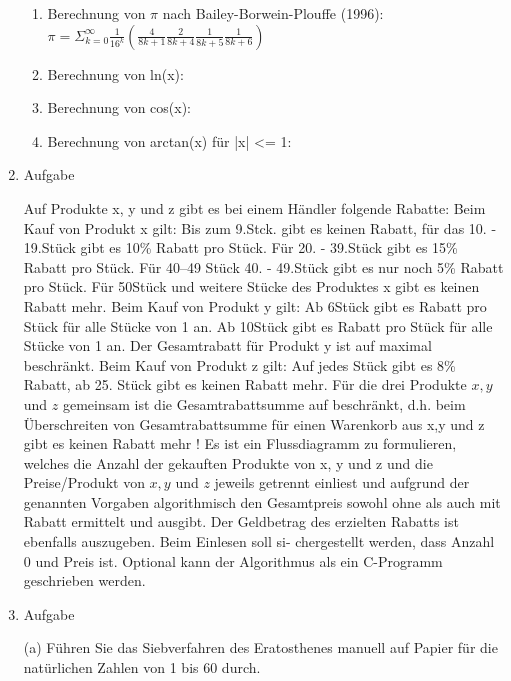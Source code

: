 \documentclass[12pt,a4paper]{scrreprt}
\begin{document}
\begin{enumerate}
\begin{enumerate}
\item Berechnung von $\pi$ nach Bailey-Borwein-Plouffe (1996): $ \pi = \Sigma_{k=0}^{\infty} \frac{1}{16^k} \left( \frac{4}{8k+1} \frac{2}{8k+4} \frac{1}{8k+5} \frac{1}{8k+6} \right)  $

\item Berechnung von ln(x):

\item Berechnung von cos(x):

\item Berechnung von arctan(x) für |x| <= 1:

\end{enumerate}

\item Aufgabe %

Auf Produkte x, y und z gibt es bei einem Händler folgende Rabatte:
Beim Kauf von Produkt x gilt:
Bis zum 9.Stck. gibt es keinen Rabatt, für das 10. - 19.Stück gibt es 10\% Rabatt pro Stück.
Für 20. - 39.Stück gibt es 15\% Rabatt pro Stück.
Für \numrange{40}{49} Stück 40. - 49.Stück gibt es nur noch 5\% Rabatt pro Stück.
Für \si{50}{Stück} und weitere Stücke des Produktes x gibt es keinen Rabatt mehr.
Beim Kauf von Produkt y gilt:
Ab \si{6}{Stück} gibt es  Rabatt pro Stück für alle Stücke von 1 an.
Ab \si{10}{Stück} gibt es  Rabatt pro Stück für alle Stücke von 1 an.
Der Gesamtrabatt für Produkt y ist auf maximal  beschränkt.
Beim Kauf von Produkt z gilt:
Auf jedes Stück gibt es 8\% Rabatt, ab 25. Stück gibt es keinen Rabatt mehr.
Für die drei Produkte $x, y$ und $z$ gemeinsam ist die Gesamtrabattsumme auf 
beschränkt, d.h. beim Überschreiten von  Gesamtrabattsumme für einen Warenkorb
aus x,y und z gibt es keinen Rabatt mehr !
Es ist ein Flussdiagramm zu formulieren, welches die Anzahl der gekauften Produkte von
x, y und z und die Preise/Produkt von $x, y$ und $z$ jeweils getrennt einliest und aufgrund der
genannten Vorgaben algorithmisch den Gesamtpreis sowohl ohne als auch mit Rabatt ermittelt
und ausgibt. Der Geldbetrag des erzielten Rabatts ist ebenfalls auszugeben. Beim Einlesen soll si-
chergestellt werden, dass Anzahl 0 und Preis  ist.
Optional kann der Algorithmus als ein C-Programm geschrieben werden.

\item Aufgabe %

(a) Führen Sie das Siebverfahren des Eratosthenes manuell auf Papier für die natürlichen Zahlen von 1 bis 60 durch.


\end{enumerate}
\end{document}
